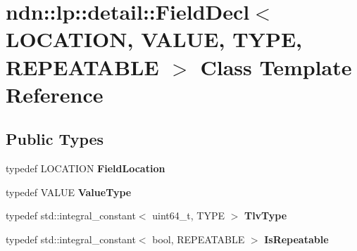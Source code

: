 \hypertarget{classndn_1_1lp_1_1detail_1_1FieldDecl}{}\section{ndn\+:\+:lp\+:\+:detail\+:\+:Field\+Decl$<$ L\+O\+C\+A\+T\+I\+ON, V\+A\+L\+UE, T\+Y\+PE, R\+E\+P\+E\+A\+T\+A\+B\+LE $>$ Class Template Reference}
\label{classndn_1_1lp_1_1detail_1_1FieldDecl}
\subsection*{Public Types}
\begin{DoxyCompactItemize}
\item 
typedef L\+O\+C\+A\+T\+I\+ON {\bfseries Field\+Location}\hypertarget{classndn_1_1lp_1_1detail_1_1FieldDecl_a868e2c4d312e1283f0a449842fa6011a}{}\label{classndn_1_1lp_1_1detail_1_1FieldDecl_a868e2c4d312e1283f0a449842fa6011a}

\item 
typedef V\+A\+L\+UE {\bfseries Value\+Type}\hypertarget{classndn_1_1lp_1_1detail_1_1FieldDecl_a7d272f3036eedd9237eeee4d514c8ccd}{}\label{classndn_1_1lp_1_1detail_1_1FieldDecl_a7d272f3036eedd9237eeee4d514c8ccd}

\item 
typedef std\+::integral\+\_\+constant$<$ uint64\+\_\+t, T\+Y\+PE $>$ {\bfseries Tlv\+Type}\hypertarget{classndn_1_1lp_1_1detail_1_1FieldDecl_ac952f4f2af02d70990c414abe9d5400e}{}\label{classndn_1_1lp_1_1detail_1_1FieldDecl_ac952f4f2af02d70990c414abe9d5400e}

\item 
typedef std\+::integral\+\_\+constant$<$ bool, R\+E\+P\+E\+A\+T\+A\+B\+LE $>$ {\bfseries Is\+Repeatable}\hypertarget{classndn_1_1lp_1_1detail_1_1FieldDecl_ad473a284980ab81d3d83977f74c3c688}{}\label{classndn_1_1lp_1_1detail_1_1FieldDecl_ad473a284980ab81d3d83977f74c3c688}

\end{DoxyCompactItemize}

